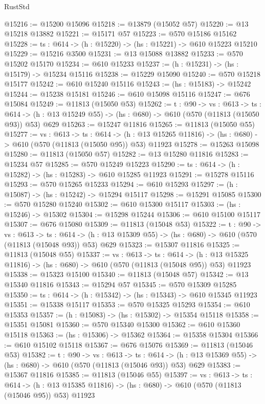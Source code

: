 \begin{lexlean}{RustStd}
\begin{coremodule}
@15216 := @15200 @15096
@15218 := @13879 (@15052 @57)
@15220 := @13 @15218 @13882
@15221 := @15171 @57
@15223 := @570 @15186 @15162
@15228 := {ts : @614} -> (h : @15220) -> (hs : @15221) -> @610 @15223 @15210
@15229 := @15216 @3500
@15231 := @13 @15088 @13882
@15233 := @570 @15202 @15170
@15234 := @610 @15233
@15237 := (h : @15231) -> (hs : @15179) -> @15234 @15116
@15238 := @15229 @15090
@15240 := @570 @15218 @15177
@15242 := @610 @15240 @15116
@15243 := (hs : @15183) -> @15242
@15244 := @15238 @15181
@15246 := @610 @15098 @15116
@15247 := @676 @15084
@15249 := @11813 (@15050 @53)
@15262 := {t : @90} ->
  {vs : @613} ->
  {ts : @614} -> (h : @13 @15249 @55) -> (hs : @680) -> @610 (@570 (@11813 (@15050 @93)) @53) @629
@15263 := @15247 @11816
@15265 := @11813 (@15050 @55)
@15277 := {vs : @613} ->
  {ts : @614} ->
  (h : @13 @15265 @11816) -> (hs : @680) -> @610 (@570 (@11813 (@15050 @95)) @53) @11923
@15278 := @15263 @15098
@15280 := @11813 (@15050 @57)
@15282 := @13 @15280 @11816
@15283 := @15234 @57
@15285 := @570 @15249 @15223
@15290 := {ts : @614} -> (h : @15282) -> (hs : @15283) -> @610 @15285 @11923
@15291 := @15278 @15116
@15293 := @570 @15265 @15233
@15294 := @610 @15293
@15297 := (h : @15087) -> (hs : @15242) -> @15294 @15117
@15298 := @15291 @15085
@15300 := @570 @15280 @15240
@15302 := @610 @15300 @15117
@15303 := (hs : @15246) -> @15302
@15304 := @15298 @15244
@15306 := @610 @15100 @15117
@15307 := @676 @15080
@15309 := @11813 (@15048 @53)
@15322 := {t : @90} ->
  {vs : @613} ->
  {ts : @614} -> (h : @13 @15309 @55) -> (hs : @680) -> @610 (@570 (@11813 (@15048 @93)) @53) @629
@15323 := @15307 @11816
@15325 := @11813 (@15048 @55)
@15337 := {vs : @613} ->
  {ts : @614} ->
  (h : @13 @15325 @11816) -> (hs : @680) -> @610 (@570 (@11813 (@15048 @95)) @53) @11923
@15338 := @15323 @15100
@15340 := @11813 (@15048 @57)
@15342 := @13 @15340 @11816
@15343 := @15294 @57
@15345 := @570 @15309 @15285
@15350 := {ts : @614} -> (h : @15342) -> (hs : @15343) -> @610 @15345 @11923
@15351 := @15338 @15117
@15353 := @570 @15325 @15293
@15354 := @610 @15353
@15357 := (h : @15083) -> (hs : @15302) -> @15354 @15118
@15358 := @15351 @15081
@15360 := @570 @15340 @15300
@15362 := @610 @15360 @15118
@15363 := (hs : @15306) -> @15362
@15364 := @15358 @15304
@15366 := @610 @15102 @15118
@15367 := @676 @15076
@15369 := @11813 (@15046 @53)
@15382 := {t : @90} ->
  {vs : @613} ->
  {ts : @614} -> (h : @13 @15369 @55) -> (hs : @680) -> @610 (@570 (@11813 (@15046 @93)) @53) @629
@15383 := @15367 @11816
@15385 := @11813 (@15046 @55)
@15397 := {vs : @613} ->
  {ts : @614} ->
  (h : @13 @15385 @11816) -> (hs : @680) -> @610 (@570 (@11813 (@15046 @95)) @53) @11923

\end{coremodule}
\end{lexlean}
